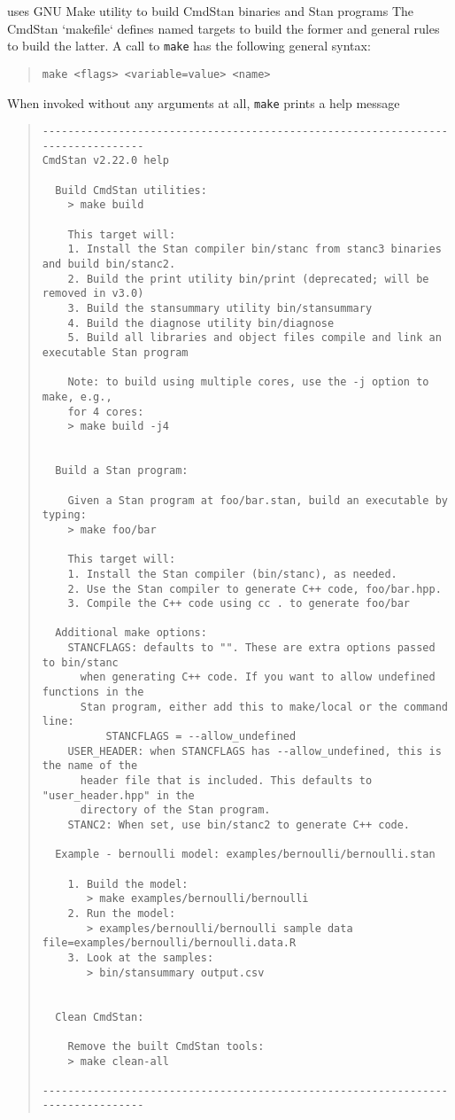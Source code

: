\CmdStan uses GNU Make utility to build CmdStan binaries and Stan programs
The CmdStan `makefile` defines named targets to build the former and
general rules to build the latter.
A call to {\tt make} has the following general syntax:
%
\begin{quote}
\begin{Verbatim}[fontshape=sl]
make <flags> <variable=value> <name>
\end{Verbatim}
\end{quote}
%
When invoked without any arguments at all, {\tt make} prints a help message
%
\begin{quote}
\begin{Verbatim}[fontshape=sl, fontsize=\footnotesize]
--------------------------------------------------------------------------------
CmdStan v2.22.0 help

  Build CmdStan utilities:
    > make build

    This target will:
    1. Install the Stan compiler bin/stanc from stanc3 binaries and build bin/stanc2.
    2. Build the print utility bin/print (deprecated; will be removed in v3.0)
    3. Build the stansummary utility bin/stansummary
    4. Build the diagnose utility bin/diagnose
    5. Build all libraries and object files compile and link an executable Stan program

    Note: to build using multiple cores, use the -j option to make, e.g., 
    for 4 cores:
    > make build -j4


  Build a Stan program:

    Given a Stan program at foo/bar.stan, build an executable by typing:
    > make foo/bar

    This target will:
    1. Install the Stan compiler (bin/stanc), as needed.
    2. Use the Stan compiler to generate C++ code, foo/bar.hpp.
    3. Compile the C++ code using cc . to generate foo/bar

  Additional make options:
    STANCFLAGS: defaults to "". These are extra options passed to bin/stanc
      when generating C++ code. If you want to allow undefined functions in the
      Stan program, either add this to make/local or the command line:
          STANCFLAGS = --allow_undefined
    USER_HEADER: when STANCFLAGS has --allow_undefined, this is the name of the
      header file that is included. This defaults to "user_header.hpp" in the
      directory of the Stan program.
    STANC2: When set, use bin/stanc2 to generate C++ code.

  Example - bernoulli model: examples/bernoulli/bernoulli.stan

    1. Build the model:
       > make examples/bernoulli/bernoulli
    2. Run the model:
       > examples/bernoulli/bernoulli sample data file=examples/bernoulli/bernoulli.data.R
    3. Look at the samples:
       > bin/stansummary output.csv


  Clean CmdStan:

    Remove the built CmdStan tools:
    > make clean-all

--------------------------------------------------------------------------------
\end{Verbatim}
\end{quote}
